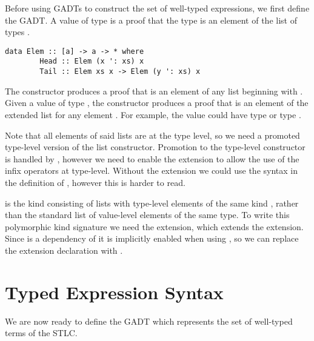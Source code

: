 Before using GADTs to construct the set of well-typed expressions, we first define the  GADT. A value of type  is a proof that the type  is an element of the list of types . 

\begin{lstlisting}[morekeywords={a, [a], x, xs, y}]
    data Elem :: [a] -> a -> * where
        Head :: Elem (x ': xs) x
        Tail :: Elem xs x -> Elem (y ': xs) x
\end{lstlisting}
\cite{GADTs}

The  constructor produces a proof that  is an element of any list beginning with . Given a value of type , the  constructor produces a proof that  is an element of the extended list  for any element . For example, the value  could have type  or type . 

Note that all elements of said lists are at the type level, so we need a promoted type-level version of the \elemcode{(:)} list constructor. Promotion to the type-level constructor  is handled by , however we need to enable the  extension to allow the use of the infix operators at type-level. Without the  extension we could use the syntax  in the definition of , however this is harder to read.

\elemcode{[a]} is the kind consisting of lists with type-level elements of the same kind , rather than the standard list of value-level elements of the same type. To write this polymorphic kind signature we need the  extension, which extends the  extension. Since  is a dependency of  it is implicitly enabled when using , so we can replace the  extension declaration with .


\section{Typed Expression Syntax}
\label{sect:typedsyntax}

We are now ready to define the  GADT which represents the set of well-typed terms of the STLC.

